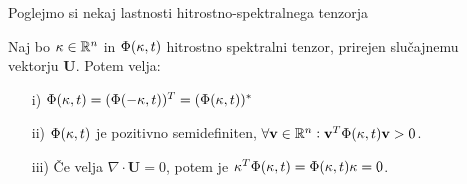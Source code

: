 \documentclass[mat2, tisk]{fmfdelo}
\newcommand{\R}{\mathbb R}
\newcommand{\bd}{\textbf}
\begin{document}
Poglejmo si nekaj lastnosti hitrostno-spektralnega tenzorja 
\begin{trditev}
\label{hitrostno_spektralni_tenzor_lastnosti}
Naj bo $\text{\bd{$\kappa$}} \in \R^n$ in $\Phi(\text{\bd{$\kappa$}}, t)$ hitrostno spektralni 
tenzor, prirejen slučajnemu vektorju $\bd{U}$. Potem velja:
\begin{enumerate}
  \item[i)] $\Phi(\text{\bd{$\kappa$}}, t) = (\Phi(-\text{\bd{$\kappa$}}, t))^T = (\Phi(\text{\bd{$\kappa$}}, t))^*$
  \item[ii)] $\Phi(\text{\bd{$\kappa$}}, t)$ je pozitivno semidefiniten, 
  $\forall \bd{v} \in \R^n: \bd{v}^T \Phi(\text{\bd{$\kappa$}}, t) \bd{v} > 0$.
  \item[iii)] Če velja $\nabla \cdot \bd{U} = 0$, potem je 
  $\text{\bd{$\kappa$}}^T \Phi(\text{\bd{$\kappa$}}, t) = \Phi(\text{\bd{$\kappa$}}, t) \text{\bd{$\kappa$}} = 0$.
\end{enumerate}
\end{trditev}
\end{document}
